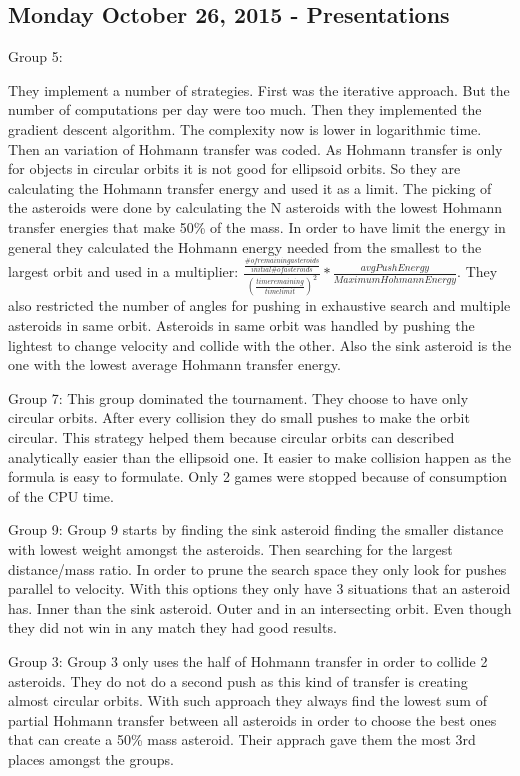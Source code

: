 \subsection{Monday October 26, 2015 - Presentations}

Group 5:

They implement a number of strategies. First was the iterative approach. But the
number of computations per day were too much. Then they implemented the gradient
descent algorithm. The complexity now is lower in logarithmic time. Then an 
variation of Hohmann transfer was coded. As Hohmann transfer is only for objects
in circular orbits it is not good for ellipsoid orbits. So they are calculating 
the Hohmann transfer energy and used it as a limit. The picking of the asteroids
were done by calculating the N asteroids with the lowest Hohmann transfer energies
that make 50\% of the mass. In order to have limit the energy in general they 
calculated the Hohmann energy needed from the smallest to the largest orbit and
used in a multiplier: $\frac{\frac{\# of remaining asteroids}{initial \# of asteroids}}{(\frac{time remaining}{time limit})^2}*\frac{avgPush Energy}{Maximum Hohmann Energy}$.
They also restricted the number of angles for pushing in exhaustive search and
multiple asteroids in same orbit. Asteroids in same orbit was handled by pushing 
the lightest to change velocity and collide with the other. Also the sink asteroid 
is the one with the lowest average Hohmann transfer energy.

Group 7:
This group dominated the tournament. They choose to have only circular orbits. 
After every collision they do small pushes to make the orbit circular. This strategy
helped them because circular orbits can described analytically easier than the
ellipsoid one. It easier to make collision happen as the formula is easy to 
formulate. Only 2 games were stopped because of consumption of the CPU time.

Group 9:
Group 9 starts by finding the sink asteroid finding the smaller distance with lowest
weight amongst the asteroids. Then searching for the largest distance/mass ratio.
In order to prune the search space they only look for pushes parallel to velocity.
With this options they only have 3 situations that an asteroid has. Inner than
the sink asteroid. Outer and in an intersecting orbit. Even though they did not 
win in any match they had good results.

Group 3:
Group 3 only uses the half of Hohmann transfer in order to collide 2 asteroids.
They do not do a second push as this kind of transfer is creating almost circular
orbits. With such approach they always find the lowest sum of partial Hohmann
transfer between all asteroids in order to choose the best ones that can create
a 50\% mass asteroid. Their apprach gave them the most 3rd places amongst the groups.

